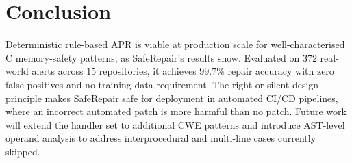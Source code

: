 \documentclass[conference]{IEEEtran}
\begin{document}

\section{Conclusion}

Deterministic rule-based APR is viable at production scale for well-characterised
C memory-safety patterns, as SafeRepair's results show. Evaluated on 372 real-world
alerts across 15 repositories, it achieves 99.7\% repair accuracy with zero false
positives and no training data requirement. The right-or-silent design principle
makes SafeRepair safe for deployment in automated CI/CD pipelines, where an
incorrect automated patch is more harmful than no patch. Future work will extend
the handler set to additional CWE patterns and introduce AST-level operand
analysis to address interprocedural and multi-line cases currently skipped.

\end{document}
